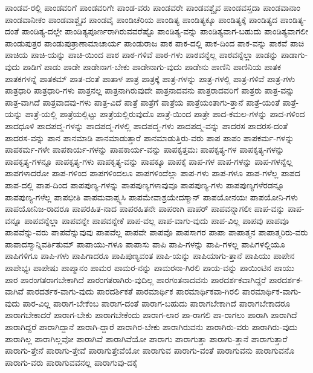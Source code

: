 {ಪಾಂಡವ-ರಲ್ಲಿ
ಪಾಂಡವರಿಗೆ
ಪಾಂಡವರಿಗೇ
ಪಾಂಡ-ವರು
ಪಾಂಡವರೇ
ಪಾಂಡವಶ್ಚೈವ
ಪಾಂಡವಸ್ತದಾ
ಪಾಂಡವಾನಾಂ
ಪಾಂಡವಾನೀಕಂ
ಪಾಂಡವಾಶ್ಚೈವ
ಪಾಂಡವೈ
ಪಾಂಡಿಚೆರಿಯ
ಪಾಂಡಿತ್ಯ
ಪಾಂಡಿತ್ಯಕ್ಕೂ
ಪಾಂಡಿತ್ಯಕ್ಕೆ
ಪಾಂಡಿತ್ಯದ
ಪಾಂಡಿತ್ಯ-ದಂತೆ
ಪಾಂಡಿತ್ಯ-ದಲ್ಲೇ
ಪಾಂಡಿತ್ಯಪೂರ್ಣರಾಗಿರುವವರೆಷ್ಟೊ
ಪಾಂಡಿತ್ಯ-ವನ್ನು
ಪಾಂಡಿತ್ಯವಾಗ-ಬಹುದು
ಪಾಂಡಿತ್ಯವಾಗಲೀ
ಪಾಂಡುಪುತ್ರರ
ಪಾಂಡುಪುತ್ರಾಣಾಮಾಚಾರ್ಯ
ಪಾಂಡುರಾಜ
ಪಾಕ
ಪಾಕ-ದಲ್ಲಿ
ಪಾಕ-ದಿಂದ
ಪಾಕ-ವನ್ನು
ಪಾಕವೆ
ಪಾಚಿ
ಪಾಚಿಯ
ಪಾಚಿ-ಯನ್ನು
ಪಾಚಿ-ಯಿಂದ
ಪಾಠ
ಪಾಠ-ಗಳಿವೆ
ಪಾಠ-ಗಳು
ಪಾಠವನ್ನೆಲ್ಲ
ಪಾಠವನ್ನೆಲ್ಲಾ
ಪಾಡನ್ನು
ಪಾಡಾಗು-ವುದು
ಪಾಡಿಗೆ
ಪಾಡು
ಪಾಡೇ
ಪಾಡೇನಾಗ-ಬೇಕು
ಪಾಡೇನಾಗು-ವುದು
ಪಾಡೇನು
ಪಾಣಿನಿ
ಪಾಣಿನಿಯ
ಪಾತಕ
ಪಾತಕಗಳನ್ನೆ
ಪಾತಕಮ್
ಪಾತ-ದಂತೆ
ಪಾತಾಳ
ಪಾತ್ರ
ಪಾತ್ರಕ್ಕೆ
ಪಾತ್ರ-ಗಳನ್ನು
ಪಾತ್ರ-ಗಳಲ್ಲಿ
ಪಾತ್ರ-ಗಳಿವೆ
ಪಾತ್ರ-ಗಳು
ಪಾತ್ರಧಾರಿ
ಪಾತ್ರಧಾರಿ-ಗಳು
ಪಾತ್ರನಲ್ಲ
ಪಾತ್ರನಾಗಿರುವುದೇ
ಪಾತ್ರನಾದವನು
ಪಾತ್ರರಾದವರಿಗೆ
ಪಾತ್ರರು
ಪಾತ್ರ-ವನ್ನು
ಪಾತ್ರ-ವಾಗಿದೆ
ಪಾತ್ರವಾದವು-ಗಳು
ಪಾತ್ರ-ವಿದೆ
ಪಾತ್ರೆ
ಪಾತ್ರೆಗೆ
ಪಾತ್ರೆಯ
ಪಾತ್ರೆಯಂತಾಗು-ತ್ತಾನೆ
ಪಾತ್ರೆ-ಯಂತೆ
ಪಾತ್ರೆ-ಯನ್ನು
ಪಾತ್ರೆ-ಯಲ್ಲಿ
ಪಾತ್ರೆಯಲ್ಲಿಟ್ಟು
ಪಾತ್ರೆಯಲ್ಲಿರುವುದೊ
ಪಾತ್ರೆ-ಯಿಂದ
ಪಾತ್ರೇ
ಪಾದ-ಕಮಲ-ಗಳನ್ನು
ಪಾದ-ಗಳಿಂದ
ಪಾದಧೂಳಿ
ಪಾದಪದ್ಮ-ಗಳನ್ನು
ಪಾದಪದ್ಮ-ಗಳಲ್ಲಿ
ಪಾದಪದ್ಮ-ಗಳು
ಪಾದಪದ್ಮ-ವನ್ನು
ಪಾದರಸ
ಪಾದರಸ-ದಂತೆ
ಪಾದರಸ-ವನ್ನು
ಪಾನ
ಪಾನಮಾಡಿ
ಪಾನಮಾಡುತ್ತಾರೆ
ಪಾನಮಾಡುತ್ತಿರು-ವರು
ಪಾಪ
ಪಾಪಂ
ಪಾಪಕರ್ಮ-ಗಳನ್ನು
ಪಾಪಕರ್ಮ-ಗಳೇ
ಪಾಪಕಾರ್ಯ-ಗಳನ್ನು
ಪಾಪಕಾರ್ಯ-ವನ್ನು
ಪಾಪಕೃತ್ತಮಃ
ಪಾಪಕೃತ್ಯ-ಗಳ
ಪಾಪಕೃತ್ಯ-ಗಳನ್ನು
ಪಾಪಕೃತ್ಯ-ಗಳನ್ನೂ
ಪಾಪಕೃತ್ಯ-ಗಳು
ಪಾಪಕೃತ್ಯ-ವನ್ನು
ಪಾಪಕ್ಕೂ
ಪಾಪಕ್ಕೆ
ಪಾಪ-ಗಳ
ಪಾಪ-ಗಳನ್ನು
ಪಾಪ-ಗಳನ್ನೆಲ್ಲ
ಪಾಪಗಳಾದರೋ
ಪಾಪ-ಗಳಿಂದ
ಪಾಪಗಳಿಂದಲೂ
ಪಾಪಗಳಿಂದೆಲ್ಲಾ
ಪಾಪ-ಗಳು
ಪಾಪ-ಗಳೂ
ಪಾಪ-ಗಳೆಲ್ಲ
ಪಾಪದ
ಪಾಪ-ದಲ್ಲಿ
ಪಾಪ-ದಿಂದ
ಪಾಪಪುಣ್ಯ-ಗಳನ್ನು
ಪಾಪಪುಣ್ಯಗಳಾವುವೂ
ಪಾಪಪುಣ್ಯ-ಗಳು
ಪಾಪಪುಣ್ಯಗಳೆರಡನ್ನೂ
ಪಾಪಪುಣ್ಯ-ಗಳೆಲ್ಲ
ಪಾಪಭೀತಿ
ಪಾಪಮವಾಪ್ಸ್ಯಸಿ
ಪಾಪಮೇವಾಶ್ರಯೇದಸ್ಮಾನ್
ಪಾಪಯೋನಯಃ
ಪಾಪಯೋನಿ-ಗಳು
ಪಾಪಯೋನಿಜ-ರಾದರೂ
ಪಾಪರಹಿತ-ನಾದ
ಪಾಪರಹಿತನೇ
ಪಾಪರಾಗಿ
ಪಾಪರ್
ಪಾಪವನ್ನಾಗಲೀ
ಪಾಪ-ವನ್ನು
ಪಾಪ-ವನ್ನೂ
ಪಾಪವನ್ನೆಲ್ಲಾ
ಪಾಪವನ್ನೇ
ಪಾಪವನ್ನೇಕೆ
ಪಾಪ-ವಲ್ಲ
ಪಾಪ-ವಾಗು-ವುದು
ಪಾಪ-ವಿಲ್ಲ
ಪಾಪವು
ಪಾಪವೂ
ಪಾಪವೆನ್ನು-ವರು
ಪಾಪವೆನ್ನುವುವು
ಪಾಪವೆಲ್ಲ
ಪಾಪವೇ
ಪಾಪವೊ
ಪಾಪಸಾಗರ
ಪಾಪಾ
ಪಾಪಾತ್ಮನ
ಪಾಪಾತ್ಮರಿರು-ವರು
ಪಾಪಾದಸ್ಮಾನ್ನಿವರ್ತಿತುಮ್
ಪಾಪಾಯು-ಗಳೂ
ಪಾಪಾಸು
ಪಾಪಿ
ಪಾಪಿ-ಗಳನ್ನು
ಪಾಪಿ-ಗಳಲ್ಲ
ಪಾಪಿಗಳಲ್ಲಿಯೂ
ಪಾಪಿಗಳಿಗೂ
ಪಾಪಿ-ಗಳು
ಪಾಪಿಗಾದರೂ
ಪಾಪಿಪುಣ್ಯವಂತ
ಪಾಪಿ-ಯನ್ನು
ಪಾಪಿಯಾಗು-ತ್ತಾನೆ
ಪಾಪಿಯು
ಪಾಪೇನ
ಪಾಪೇಭ್ಯಃ
ಪಾಪೇಷು
ಪಾಪ್ಮಾನಂ
ಪಾಮರ
ಪಾಮರ-ನನ್ನು
ಪಾಮರನಾ-ಗಿರಲಿ
ಪಾಯ-ವನ್ನು
ಪಾಯಿಂಟಿನ
ಪಾಯು
ಪಾರ
ಪಾರಂಗತರಾಗಬೇಕಾಗಿದೆ
ಪಾರಂಗತರಾಗಿರು-ವುದಿಲ್ಲ
ಪಾರಗಂತನಾದವನು
ಪಾರದರ್ಶಕವಾಗಿದ್ದರೆ
ಪಾರದರ್ಶಕ-ವಾಗಿವೆ
ಪಾರದರ್ಶಕ-ವಾಗು-ವುದು
ಪಾರದರ್ಶಿಕತೆ
ಪಾರಮಾರ್ಥಿಕ
ಪಾರಮಾರ್ಥಿಕವಾ-ಗಿರಲಿ
ಪಾರಮಾರ್ಥಿಕ-ವಾಗು-ವುದು
ಪಾರ-ವಿಲ್ಲ
ಪಾರಾಗ-ಬೇಕೆಂಬ
ಪಾರಾಗ-ದಂತೆ
ಪಾರಾಗ-ಬಹುದು
ಪಾರಾಗಬೇಕಾಗಿದೆ
ಪಾರಾಗಬೇಕಾದರೂ
ಪಾರಾಗಬೇಕಾದರೆ
ಪಾರಾಗ-ಬೇಕು
ಪಾರಾಗಬೇಕೆಂದು
ಪಾರಾಗ-ಲಾರ
ಪಾ-ರಾಗಲಿ
ಪಾ-ರಾಗಲು
ಪಾರಾಗಿ
ಪಾರಾಗಿದೆ
ಪಾರಾಗಿದ್ದರೆ
ಪಾರಾಗಿದ್ದಾನೆ
ಪಾರಾಗಿ-ದ್ದಾರೆ
ಪಾರಾಗಿರ-ಬೇಕು
ಪಾರಾಗಿರುವನು
ಪಾರಾಗಿರು-ವರು
ಪಾರಾಗಿರು-ವುದು
ಪಾರಾಗಿಲ್ಲ
ಪಾರಾಗಿಲ್ಲವೋ
ಪಾರಾಗಿವೆ
ಪಾರಾಗಿವೆಯೋ
ಪಾರಾಗು
ಪಾರಾಗುತ್ತಾ
ಪಾರಾಗು-ತ್ತಾನೆ
ಪಾರಾಗುತ್ತಾರೆ
ಪಾರಾಗು-ತ್ತೇನೆ
ಪಾರಾಗು-ತ್ತೇವೆ
ಪಾರಾಗುತ್ತೇವೆಯೋ
ಪಾರಾಗುವ
ಪಾರಾಗು-ವಂತೆ
ಪಾರಾಗುವನು
ಪಾರಾಗುವನೊ
ಪಾರಾಗು-ವರು
ಪಾರಾಗುವವನಲ್ಲ
ಪಾರಾಗುವು-ದಕ್ಕೆ
}
